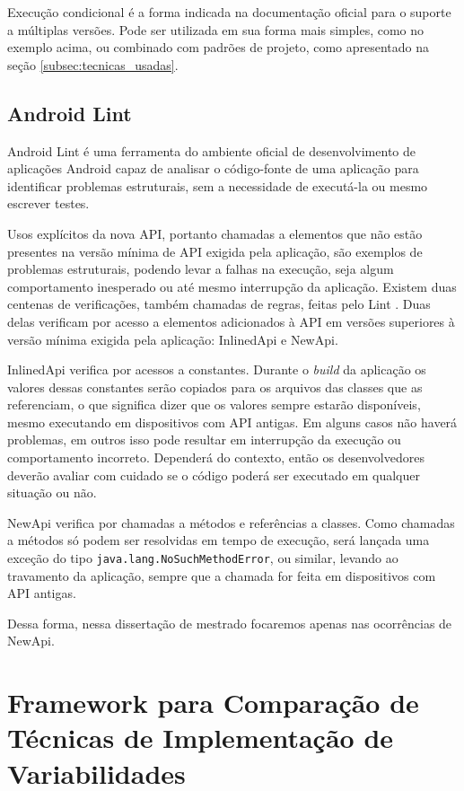 Execução condicional é a forma indicada na documentação oficial
\cite{SupportDifferentVersions} para o suporte a múltiplas versões. Pode ser
utilizada em sua forma mais simples, como no exemplo acima, ou combinado com
padrões de projeto, como apresentado na seção \ref{subsec:tecnicas_usadas}.


\subsection{Android Lint}
\label{subsec:android-lint}

Android Lint \cite{Lint2016} é uma ferramenta do ambiente oficial de desenvolvimento
de aplicações Android capaz de analisar o código-fonte de uma aplicação para identificar
problemas estruturais, sem a necessidade de executá-la ou mesmo escrever testes.

Usos explícitos da nova API, portanto chamadas a elementos que não estão presentes
na versão mínima de API exigida pela aplicação, são exemplos de problemas estruturais,
podendo levar a falhas na execução, seja algum comportamento inesperado ou até
mesmo interrupção da aplicação. Existem duas centenas de verificações, também
chamadas de regras, feitas pelo Lint \cite{LintChecks}. Duas delas verificam por
acesso a elementos adicionados à API em versões superiores à versão mínima exigida
pela aplicação: InlinedApi e NewApi.

InlinedApi verifica por acessos a constantes. Durante o \textit{build} da aplicação os
valores dessas constantes serão copiados para os arquivos das classes que as
referenciam, o que significa dizer que os valores sempre estarão disponíveis,
mesmo executando em dispositivos com API antigas. Em alguns casos não haverá
problemas, em outros isso pode resultar em interrupção da execução ou comportamento
incorreto. Dependerá do contexto, então os desenvolvedores deverão avaliar com cuidado
se o código poderá ser executado em qualquer situação ou não.

NewApi verifica por chamadas a métodos e referências a classes. Como chamadas a
métodos só podem ser resolvidas em tempo de execução, será lançada uma exceção do
tipo \texttt{java.lang.NoSuchMethodError}, ou similar, levando ao travamento da
aplicação, sempre que a chamada for feita em dispositivos com API antigas.

Dessa forma, nessa dissertação de mestrado focaremos apenas nas ocorrências de NewApi.


\section{Framework para Comparação de Técnicas de Implementação de Variabilidades}
\label{sec:framework}


